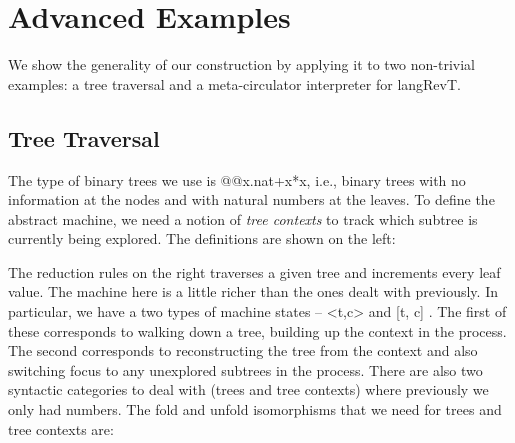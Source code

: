 \documentclass{llncs}
\begin{document}
{%
\section{Advanced Examples} 

We show the generality of our construction by applying it to two non-trivial
examples: a tree traversal and a meta-circulator interpreter for
{{langRevT}}.

\subsection{Tree Traversal}

The type of binary trees we use is {{@@x.nat+x*x}}, i.e., binary trees with
no information at the nodes and with natural numbers at the leaves. To define
the abstract machine, we need a notion of \emph{tree contexts} to track which
subtree is currently being explored. The definitions are shown on the left:

\begin{multicols}{2}
%


\end{multicols}

The reduction rules on the right traverses a given tree and increments
every leaf value.  The machine here is a little richer than the ones
dealt with previously. In particular, we have a two types of machine
states -- {{<t,c>}} and {{ {[t, c]} }}. The first of these corresponds
to walking down a tree, building up the context in the process. The
second corresponds to reconstructing the tree from the context and
also switching focus to any unexplored subtrees in the process. There
are also two syntactic categories to deal with (trees and tree
contexts) where previously we only had numbers. The {{fold}} and
{{unfold}} isomorphisms that we need for trees and tree contexts are:


}
\end{document}
